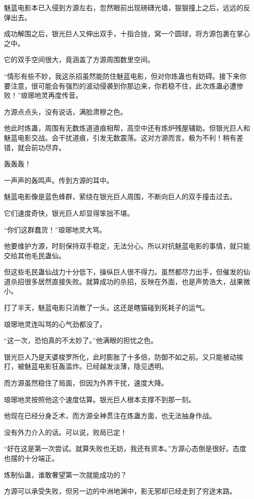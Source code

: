 \begin{this_body}
魅蓝电影本已入侵到方源左右，忽然眼前出现磅礴光墙，狠狠撞上之后，远远的反弹出去。

成功解围之后，银光巨人又伸出双手，十指合拢，窝一个圆球，将方源包裹在掌心之中。

它的双手空间很大，竟涵盖了方源周围数里空间。

“情形有些不妙，我这杀招虽然能防住魅蓝电影，但对你炼蛊也有妨碍。接下来你要注意，很可能会有强烈的波动侵袭到你那边来，你若稳不住，此次炼蛊必遭惨败！”琅琊地灵再度传音。

方源点点头，没有说话，满脸肃穆之色。

他此时炼蛊，周围有无数炼道道痕相帮，高空中还有炼炉残屋辅助。但银光巨人和魅蓝电影交战。会干扰道痕，引发无数震荡。这对方源而言。极为不利！稍有差错，就会前功尽弃。

轰轰轰！

一声声的轰鸣声。传到方源的耳中。

魅蓝电影像是蓝色蜂群，萦绕在银光巨人周围，不断向巨人的双手撞击过去。

它们速度奇快，银光巨人却显得笨拙不堪。

“你们这群蠢货！”琅琊地灵大骂。

他要维护方源，时刻保持双手稳定，无法分心。所以对抗魅蓝电影的事情，就只能交给其他毛民蛊仙。

但这些毛民蛊仙战力十分低下，操纵巨人很不得力。虽然都尽力出手，但催发的仙道杀招很多居然直接失败。就算成功的杀招，反映在外面，也是声势浩大，战果微小。

打了半天，魅蓝电影只消散了一头。这还是瞎猫碰到死耗子的运气。

琅琊地灵连叫骂的心气劲都没了。

“这一次，恐怕真的不太妙了。”他满眼的担忧之色。

银光巨人乃是天婆梭罗所化，此时膨胀了十多倍，防御不如之前。又只能被动挨打，被魅蓝电影狂轰滥炸。已经越发淡薄，隐见透明。

而方源虽然稳住了局面，但因为外界干扰，速度大降。

琅琊地灵按照他这个速度估算。银光巨人根本支撑不到那一刻。

他现在已经分身乏术，而方源全神贯注在炼蛊方面，也无法抽身作战。

没有外力介入的话。可以说，败局已定！

“好在这是第一次尝试。就算失败也无妨，我还有资本。”方源心态倒是很好。态度也摆的十分端正。

炼制仙蛊，谁敢奢望第一次就能成功的？

方源可以承受失败，但另一边的中洲地渊中，影无邪却已经走到了穷途末路。


\end{this_body}

